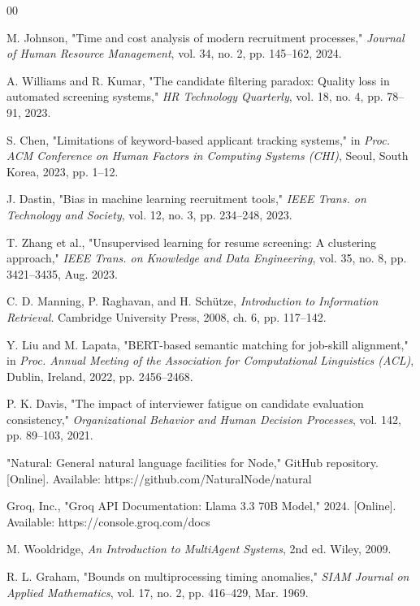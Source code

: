 \documentclass[conference]{IEEEtran}
\begin{document}
\begin{thebibliography}{00}

M. Johnson, "Time and cost analysis of modern recruitment processes," \textit{Journal of Human Resource Management}, vol. 34, no. 2, pp. 145--162, 2024.

A. Williams and R. Kumar, "The candidate filtering paradox: Quality loss in automated screening systems," \textit{HR Technology Quarterly}, vol. 18, no. 4, pp. 78--91, 2023.

S. Chen, "Limitations of keyword-based applicant tracking systems," in \textit{Proc. ACM Conference on Human Factors in Computing Systems (CHI)}, Seoul, South Korea, 2023, pp. 1--12.

J. Dastin, "Bias in machine learning recruitment tools," \textit{IEEE Trans. on Technology and Society}, vol. 12, no. 3, pp. 234--248, 2023.

T. Zhang et al., "Unsupervised learning for resume screening: A clustering approach," \textit{IEEE Trans. on Knowledge and Data Engineering}, vol. 35, no. 8, pp. 3421--3435, Aug. 2023.

C. D. Manning, P. Raghavan, and H. Schütze, \textit{Introduction to Information Retrieval}. Cambridge University Press, 2008, ch. 6, pp. 117--142.

Y. Liu and M. Lapata, "BERT-based semantic matching for job-skill alignment," in \textit{Proc. Annual Meeting of the Association for Computational Linguistics (ACL)}, Dublin, Ireland, 2022, pp. 2456--2468.

P. K. Davis, "The impact of interviewer fatigue on candidate evaluation consistency," \textit{Organizational Behavior and Human Decision Processes}, vol. 142, pp. 89--103, 2021.

"Natural: General natural language facilities for Node," GitHub repository. [Online]. Available: https://github.com/NaturalNode/natural

Groq, Inc., "Groq API Documentation: Llama 3.3 70B Model," 2024. [Online]. Available: https://console.groq.com/docs

M. Wooldridge, \textit{An Introduction to MultiAgent Systems}, 2nd ed. Wiley, 2009.

R. L. Graham, "Bounds on multiprocessing timing anomalies," \textit{SIAM Journal on Applied Mathematics}, vol. 17, no. 2, pp. 416--429, Mar. 1969.

\end{thebibliography}
\end{document}
